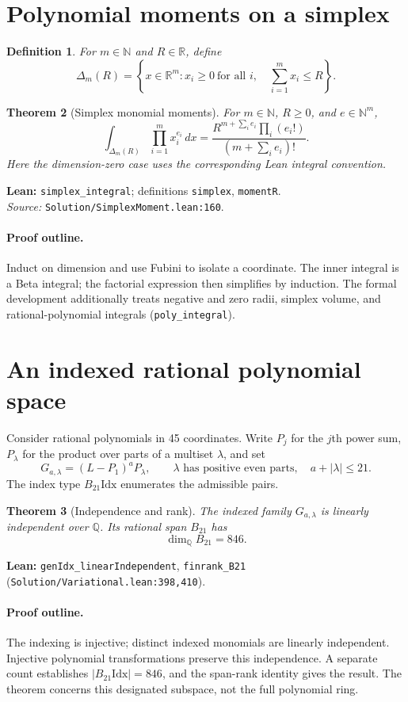 \documentclass[11pt]{article}
\newtheorem{theorem}{Theorem}[section]
\newtheorem{definition}[theorem]{Definition}
\newcommand{\Q}{\mathbb{Q}}
\newcommand{\R}{\mathbb{R}}
\newcommand{\N}{\mathbb{N}}
\newcommand{\code}[1]{\texttt{#1}}
\begin{document}
\section{Polynomial moments on a simplex}
\begin{definition}
For $m\in\N$ and $R\in\R$, define
\[
 \Delta_m(R)=\left\{x\in\R^m: x_i\ge 0\ \text{for all }i,
 \quad\sum_{i=1}^m x_i\le R\right\}.
\]
\end{definition}
\begin{theorem}[Simplex monomial moments]\label{thm:simplex}
For $m\in\N$, $R\ge0$, and $e\in\N^m$,
\[
 \int_{\Delta_m(R)}\prod_{i=1}^{m}x_i^{e_i}\,dx
 =\frac{R^{m+\sum_i e_i}\prod_i(e_i!)}{(m+\sum_i e_i)!}.
\]
Here the dimension-zero case uses the corresponding Lean integral convention.
\end{theorem}
\noindent\textbf{Lean:} \code{simplex\_integral}; definitions \code{simplex}, \code{momentR}.\\
\textit{Source:} \nolinkurl{Solution/SimplexMoment.lean:160}.

\paragraph{Proof outline.}
Induct on dimension and use Fubini to isolate a coordinate. The inner integral is a
Beta integral; the factorial expression then simplifies by induction. The formal
development additionally treats negative and zero radii, simplex volume, and
rational-polynomial integrals (\code{poly\_integral}).

\section{An indexed rational polynomial space}
Consider rational polynomials in 45 coordinates. Write $P_j$ for the $j$th power sum,
$P_{\lambda}$ for the product over parts of a multiset $\lambda$, and set
\[
 G_{a,\lambda}=(L-P_1)^aP_{\lambda},\qquad
 \lambda\text{ has positive even parts},\quad a+|\lambda|\le21.
\]
The index type $B_{21}\mathrm{Idx}$ enumerates the admissible pairs.
\begin{theorem}[Independence and rank]\label{thm:basis}
The indexed family $G_{a,\lambda}$ is linearly independent over $\Q$. Its rational span
$B_{21}$ has
\[
 \dim_{\Q}B_{21}=846.
\]
\end{theorem}
\noindent\textbf{Lean:} \code{genIdx\_linearIndependent},
\code{finrank\_B21} (\nolinkurl{Solution/Variational.lean:398,410}).

\paragraph{Proof outline.}
The indexing is injective; distinct indexed monomials are linearly independent.
Injective polynomial transformations preserve this independence. A separate count
establishes $|B_{21}\mathrm{Idx}|=846$, and the span-rank identity gives the result.
The theorem concerns this designated subspace, not the full polynomial ring.
\end{document}

